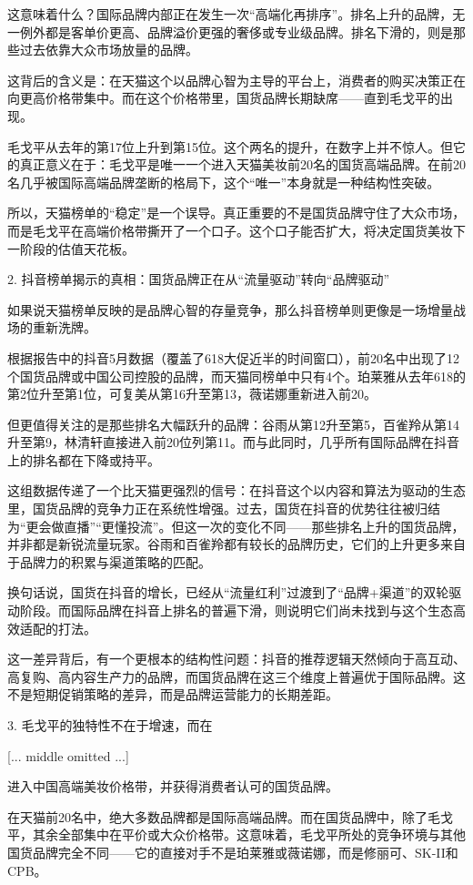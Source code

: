 \documentclass[11pt]{ctexart}
\begin{document}
这意味着什么？国际品牌内部正在发生一次“高端化再排序”。排名上升的品牌，无一例外都是客单价更高、品牌溢价更强的奢侈或专业级品牌。排名下滑的，则是那些过去依靠大众市场放量的品牌。

这背后的含义是：在天猫这个以品牌心智为主导的平台上，消费者的购买决策正在向更高价格带集中。而在这个价格带里，国货品牌长期缺席——直到毛戈平的出现。

毛戈平从去年的第17位上升到第15位。这个两名的提升，在数字上并不惊人。但它的真正意义在于：毛戈平是唯一一个进入天猫美妆前20名的国货高端品牌。在前20名几乎被国际高端品牌垄断的格局下，这个“唯一”本身就是一种结构性突破。

所以，天猫榜单的“稳定”是一个误导。真正重要的不是国货品牌守住了大众市场，而是毛戈平在高端价格带撕开了一个口子。这个口子能否扩大，将决定国货美妆下一阶段的估值天花板。

2. 抖音榜单揭示的真相：国货品牌正在从“流量驱动”转向“品牌驱动”

如果说天猫榜单反映的是品牌心智的存量竞争，那么抖音榜单则更像是一场增量战场的重新洗牌。

根据报告中的抖音5月数据（覆盖了618大促近半的时间窗口），前20名中出现了12个国货品牌或中国公司控股的品牌，而天猫同榜单中只有4个。珀莱雅从去年618的第2位升至第1位，可复美从第16升至第13，薇诺娜重新进入前20。

但更值得关注的是那些排名大幅跃升的品牌：谷雨从第12升至第5，百雀羚从第14升至第9，林清轩直接进入前20位列第11。而与此同时，几乎所有国际品牌在抖音上的排名都在下降或持平。

这组数据传递了一个比天猫更强烈的信号：在抖音这个以内容和算法为驱动的生态里，国货品牌的竞争力正在系统性增强。过去，国货在抖音的优势往往被归结为“更会做直播”“更懂投流”。但这一次的变化不同——那些排名上升的国货品牌，并非都是新锐流量玩家。谷雨和百雀羚都有较长的品牌历史，它们的上升更多来自于品牌力的积累与渠道策略的匹配。

换句话说，国货在抖音的增长，已经从“流量红利”过渡到了“品牌+渠道”的双轮驱动阶段。而国际品牌在抖音上排名的普遍下滑，则说明它们尚未找到与这个生态高效适配的打法。

这一差异背后，有一个更根本的结构性问题：抖音的推荐逻辑天然倾向于高互动、高复购、高内容生产力的品牌，而国货品牌在这三个维度上普遍优于国际品牌。这不是短期促销策略的差异，而是品牌运营能力的长期差距。

3. 毛戈平的独特性不在于增速，而在

[... middle omitted ...]

进入中国高端美妆价格带，并获得消费者认可的国货品牌。

在天猫前20名中，绝大多数品牌都是国际高端品牌。而在国货品牌中，除了毛戈平，其余全部集中在平价或大众价格带。这意味着，毛戈平所处的竞争环境与其他国货品牌完全不同——它的直接对手不是珀莱雅或薇诺娜，而是修丽可、SK-II和CPB。
\end{document}
